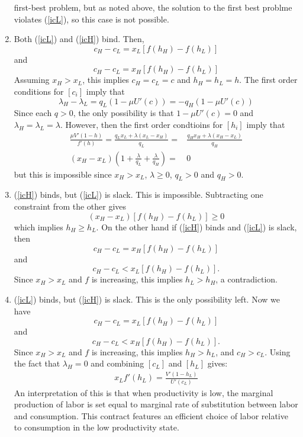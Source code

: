 \begin{example}
\begin{enumerate}
    first-best problem, but as noted above, the solution to the first
    best problme violates (\ref{icL}), so this case is not possible.
  \item Both (\ref{icL}) and (\ref{icH}) bind. Then, 
    \[ c_H - c_L = x_L[f(h_H) - f(h_L)] \]
    and 
    \[ c_H - c_L = x_H[f(h_H) - f(h_L)] \]
    Assuming $x_H > x_L$, this implies $c_H= c_L=c$ and $h_H =
    h_L=h$. The first order conditions for $[c_i]$ imply that 
    \[ \lambda_H
      - \lambda_L = q_L (1 - \mu U'(c)) = -q_H(1 - \mu U'(c)) \]
    Since each $q > 0$, the only possibility is that $1-\mu U'(c) =
    0$ and $\lambda_H = \lambda_L = \lambda$.  However, then the first
    order condtioins for $[h_i]$ imply that 
    \begin{align*}
      \frac{\mu V'(1-h)}{f'(h)} = \frac{q_L x_L + \lambda (x_L -
      x_H)}{q_L} = & \frac{q_H x_H + \lambda (x_H -
                     x_L)}{q_H} \\
      (x_H - x_L)(1 + \frac{\lambda}{q_L} + \frac{\lambda}{q_H}) = & 0
    \end{align*}
    but this is impossible since $x_H > x_L$, $\lambda\geq 0$, $q_L>0$
    and $q_H>0$.
  \item (\ref{icH}) binds, but (\ref{icL}) is slack. This is
    impossible. Subtracting one constraint from the other gives
    \[ (x_H - x_L) [f(h_H) - f(h_L)] \geq 0 \]
    which implies $h_H \geq h_L$. On the other hand if (\ref{icH})
    binds and (\ref{icL}) is slack, then 
    \[ c_H - c_L = x_H[f(h_H) - f(h_L)] \]
    and 
    \[ c_H - c_L < x_L[f(h_H) - f(h_L)]. \] 
    Since $x_H > x_L$ and $f$ is increasing, this implies $h_L > h_H$,
    a contradiction.    
  \item (\ref{icL}) binds, but (\ref{icH}) is slack.  This is the
    only possibility left. Now we have
    \[ c_H - c_L = x_L[f(h_H) - f(h_L)] \]
    and 
    \[ c_H - c_L < x_H[f(h_H) - f(h_L)]. \] Since $x_H > x_L$ and
    $f$ is increasing, this implies $h_H > h_L$, and $c_H > c_L$.
    Using the fact that $\lambda_H = 0$ and combining $[c_L]$ and
    $[h_L]$ gives:
    \begin{align}
      x_L f'(h_L) = \frac{V'(1-h_L)}{U'(c_L)} \label{eq:l}
    \end{align}
    An interpretation of this is that when productivity is low, the
    marginal production of labor is set equal to marginal rate of
    substitution between labor and consumption. This contract features
    an efficient choice of labor relative to consumption in the low
    productivity state.


\end{enumerate}
\end{example}
